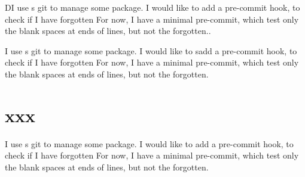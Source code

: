 \documentclass[a4paper, twoside, 12pt]{book}
\begin{document}
DI use s git to manage some package.
I would like to add a pre-commit hook, to check if I have forgotten
For now, I have a minimal pre-commit, which test only the blank spaces at ends of lines, but not the forgotten..

I use s git to manage some package.
I would like to  {s}add a pre-commit hook, to check if I have forgotten
For now, I have a minimal pre-commit, which test only the blank spaces at ends of lines, but not the forgotten.

\section{xxx}

I use s git to manage some package.
I would like to add a pre-commit hook, to check if I have forgotten
For now, I have a minimal pre-commit, which test only the blank spaces at ends of lines, but not the forgotten.
\end{document}
